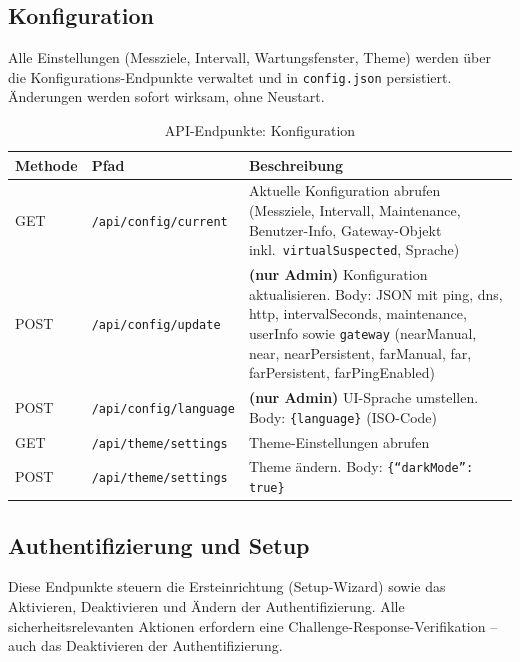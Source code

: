 \subsection{Konfiguration}

Alle Einstellungen (Messziele, Intervall, Wartungsfenster, Theme) werden
über die Konfigurations-Endpunkte verwaltet und in \texttt{config.json}
persistiert. Änderungen werden sofort wirksam, ohne Neustart.

\begin{table}[h]
\centering
\small
\begin{tabular}{|l|l|p{7cm}|}
\hline
\textbf{Methode} & \textbf{Pfad} & \textbf{Beschreibung} \\
\hline
GET & \texttt{/api/config/current} & Aktuelle Konfiguration abrufen
  (Messziele, Intervall, Maintenance, Benutzer-Info, Gateway-Objekt inkl.\ \texttt{virtualSuspected}, Sprache) \\
\hline
POST & \texttt{/api/config/update} & \textbf{(nur Admin)} Konfiguration aktualisieren.
  Body: JSON mit ping, dns, http, intervalSeconds, maintenance, userInfo sowie \texttt{gateway}
  (nearManual, near, nearPersistent, farManual, far, farPersistent, farPingEnabled) \\
\hline
POST & \texttt{/api/config/language} & \textbf{(nur Admin)} UI-Sprache umstellen. Body: \texttt{\{language\}} (ISO-Code) \\
\hline
GET & \texttt{/api/theme/settings} & Theme-Einstellungen abrufen \\
\hline
POST & \texttt{/api/theme/settings} & Theme ändern.
  Body: \texttt{\{``darkMode'': true\}} \\
\hline
\end{tabular}
\caption{API-Endpunkte: Konfiguration}
\end{table}

\subsection{Authentifizierung und Setup}

Diese Endpunkte steuern die Ersteinrichtung (Setup-Wizard) sowie das Aktivieren,
Deaktivieren und Ändern der Authentifizierung. Alle sicherheitsrelevanten Aktionen
erfordern eine Challenge-Response-Verifikation -- auch das Deaktivieren der
Authentifizierung.

